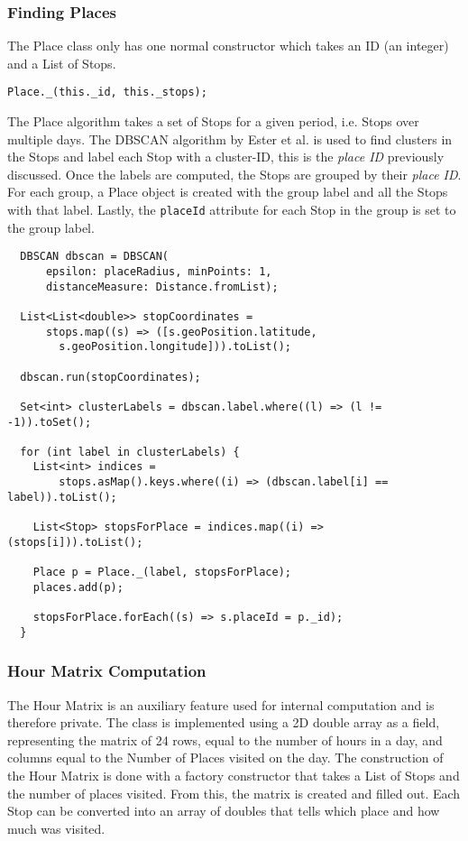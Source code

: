 \subsubsection*{Finding Places}
The Place class only has one normal constructor which takes an ID (an integer) and a List of Stops. 
\begin{verbatim}
Place._(this._id, this._stops);
\end{verbatim}

The Place algorithm takes a set of Stops for a given period, i.e. Stops over multiple days. The DBSCAN algorithm by Ester et al. \cite{density-based-1996} is used to find clusters in the Stops and label each Stop with a cluster-ID, this is the \textit{place ID} previously discussed. Once the labels are computed, the Stops are grouped by their \textit{place ID}. For each group, a Place object is created with the group label and all the Stops with that label. Lastly, the \verb|placeId| attribute for each Stop in the group is set to the group label.

\begin{verbatim}
  DBSCAN dbscan = DBSCAN(
      epsilon: placeRadius, minPoints: 1, 
      distanceMeasure: Distance.fromList);
  
  List<List<double>> stopCoordinates =
      stops.map((s) => ([s.geoPosition.latitude, 
        s.geoPosition.longitude])).toList();

  dbscan.run(stopCoordinates);

  Set<int> clusterLabels = dbscan.label.where((l) => (l != -1)).toSet();

  for (int label in clusterLabels) {
    List<int> indices =
        stops.asMap().keys.where((i) => (dbscan.label[i] == label)).toList();

    List<Stop> stopsForPlace = indices.map((i) => (stops[i])).toList();

    Place p = Place._(label, stopsForPlace);
    places.add(p);

    stopsForPlace.forEach((s) => s.placeId = p._id);
  }
\end{verbatim}


\subsubsection*{Hour Matrix Computation}
The Hour Matrix is an auxiliary feature used for internal computation and is therefore private. The class is implemented using a 2D double array as a field, representing the matrix of 24 rows, equal to the number of hours in a day, and columns equal to the Number of Places visited on the day. The construction of the Hour Matrix is done with a factory constructor that takes a List of Stops and the number of places visited. From this, the matrix is created and filled out. Each Stop can be converted into an array of doubles that tells which place and how much was visited.

